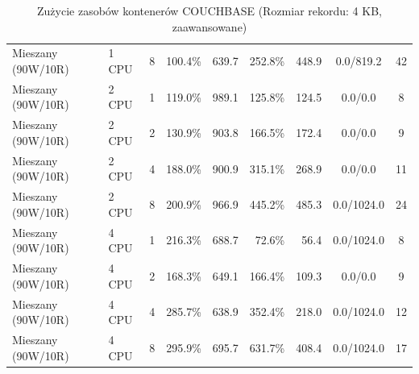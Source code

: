 \begin{table}[ht]
{\begin{tabular}{llcrrrrcc}
Mieszany (90W/10R) & 1 CPU & 8 & 100.4\% & 639.7 & 252.8\% & 448.9 & 0.0/819.2 & 42 \\
Mieszany (90W/10R) & 2 CPU & 1 & 119.0\% & 989.1 & 125.8\% & 124.5 & 0.0/0.0 & 8 \\
Mieszany (90W/10R) & 2 CPU & 2 & 130.9\% & 903.8 & 166.5\% & 172.4 & 0.0/0.0 & 9 \\
Mieszany (90W/10R) & 2 CPU & 4 & 188.0\% & 900.9 & 315.1\% & 268.9 & 0.0/0.0 & 11 \\
Mieszany (90W/10R) & 2 CPU & 8 & 200.9\% & 966.9 & 445.2\% & 485.3 & 0.0/1024.0 & 24 \\
Mieszany (90W/10R) & 4 CPU & 1 & 216.3\% & 688.7 & 72.6\% & 56.4 & 0.0/1024.0 & 8 \\
Mieszany (90W/10R) & 4 CPU & 2 & 168.3\% & 649.1 & 166.4\% & 109.3 & 0.0/0.0 & 9 \\
Mieszany (90W/10R) & 4 CPU & 4 & 285.7\% & 638.9 & 352.4\% & 218.0 & 0.0/1024.0 & 12 \\
Mieszany (90W/10R) & 4 CPU & 8 & 295.9\% & 695.7 & 631.7\% & 408.4 & 0.0/1024.0 & 17 \\
\bottomrule
\end{tabular}%
}
\caption{Zużycie zasobów kontenerów COUCHBASE (Rozmiar rekordu: 4 KB, zaawansowane)}
\label{tab:resources_couchbase_medium_0}
\end{table}
